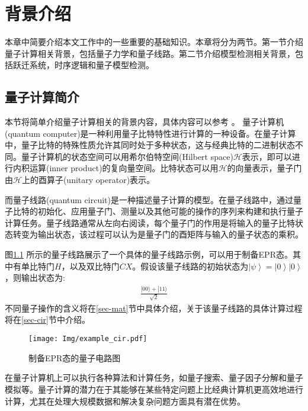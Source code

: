 \chapter{背景介绍}
本章中简要介绍本文工作中的一些重要的基础知识。本章将分为两节。第一节介绍量子计算相关背景，包括量子力学和量子线路。第二节介绍模型检测相关背景，包括跃迁系统，时序逻辑和量子模型检测。
\section{量子计算简介}
本节将简单介绍量子计算相关的背景内容，具体内容可以参考
\citep{nielsen2010quantum}。
量子计算机(quantum computer)是一种利用量子比特特性进行计算的一种设备。在量子计算中，量子比特的特殊性质允许其同时处于多种状态，这与经典比特的二进制状态不同。量子计算机的状态空间可以用希尔伯特空间(Hilbert space)\(\mathcal{H}\)表示\citep{nielsen2010quantum}，即可以进行内积运算(inner product)的复向量空间。比特状态可以用\(\mathcal{H}\)的向量表示，量子门由\(\mathcal{H}\)上的酉算子(unitary operator)表示。

而量子线路(quantum circuit)是一种描述量子计算的模型\citep{nielsen2010quantum}。在量子线路中，通过量子比特的初始化、应用量子门、测量以及其他可能的操作的序列来构建和执行量子计算任务。量子线路通常从左向右阅读，每个量子门的作用是将输入的量子比特状态转变为输出状态，该过程可以认为是量子门的酉矩阵与输入的量子状态的乘积。
\begin{example}
    \label{ex-epr}
    图\ref{fig:example_cir} 所示的量子线路展示了一个具体的量子线路示例，可以用于制备EPR态。其中有单比特门\(H\)，以及双比特门\(CX\)。假设该量子线路的初始状态为\(\left|\psi\right\rangle=\left|0\right\rangle\left|0\right\rangle\)，则输出状态为:
\begin{align}
   \frac{|00\rangle+|11\rangle}{\sqrt{2}}
\end{align}
不同量子操作的含义将在\ref{sec-mat}节中具体介绍，关于该量子线路的具体计算过程将在\ref{sec-cir}节中介绍。
\end{example}
\begin{figure}[!htbp]
    \centering
    \texttt{[image: Img/example\_cir.pdf]}
    \caption{制备EPR态的量子电路图}
    \label{fig:example_cir}
\end{figure}



在量子计算机上可以执行各种算法和计算任务，如量子搜索\citep{Grover_1996}、量子因子分解\citep{Shor}和量子模拟\citep{Feynman}等。量子计算的潜力在于其能够在某些特定问题上比经典计算机更高效地进行计算，尤其在处理大规模数据和解决复杂问题方面具有潜在优势。

